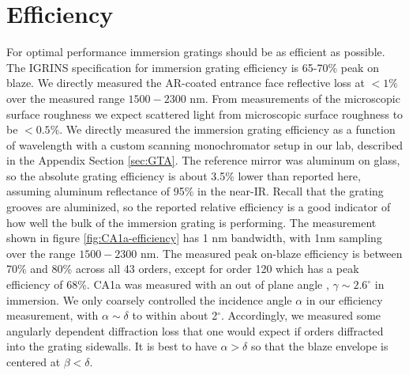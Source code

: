 \documentclass[]{spie}
\begin{document}
\section{Efficiency} 
For optimal performance immersion gratings should be as efficient as possible.  The IGRINS specification for immersion grating efficiency is 65-70\% peak on blaze\cite{wang2010}. We directly measured the AR-coated entrance face reflective loss at $<1\%$ over the measured range $1500-2300$ nm.  From measurements of the microscopic surface roughness\cite{wang2010} we expect scattered light from microscopic surface roughness to be $<0.5\%$.  We directly measured the immersion grating efficiency as a function of wavelength with a custom scanning monochromator setup in our lab, described in the Appendix Section \ref{sec:GTA}.  The reference mirror was aluminum on glass, so the absolute grating efficiency is about 3.5\% lower than reported here, assuming aluminum reflectance of 95\% in the near-IR.  Recall that the grating grooves are aluminized, so the reported relative efficiency is a good indicator of how well the bulk of the immersion grating is performing.  The measurement shown in figure \ref{fig:CA1a-efficiency} has 1 nm bandwidth, with 1nm sampling over the range $1500-2300$ nm.  The measured peak on-blaze efficiency is between 70\% and 80\% across all 43 orders, except for order 120 which has a peak efficiency of 68\%.  CA1a was measured with an out of plane angle \cite{schroeder1987}, $\gamma \sim 2.6^\circ$ in immersion.  We only coarsely controlled the incidence angle $\alpha$ in our efficiency measurement, with $\alpha \sim \delta$ to within about 2$^\circ$.  Accordingly, we measured some angularly dependent diffraction loss that one would expect if orders diffracted into the grating sidewalls.  It is best to have $\alpha > \delta$ so that the blaze envelope is centered at $\beta < \delta$.
\end{document}
